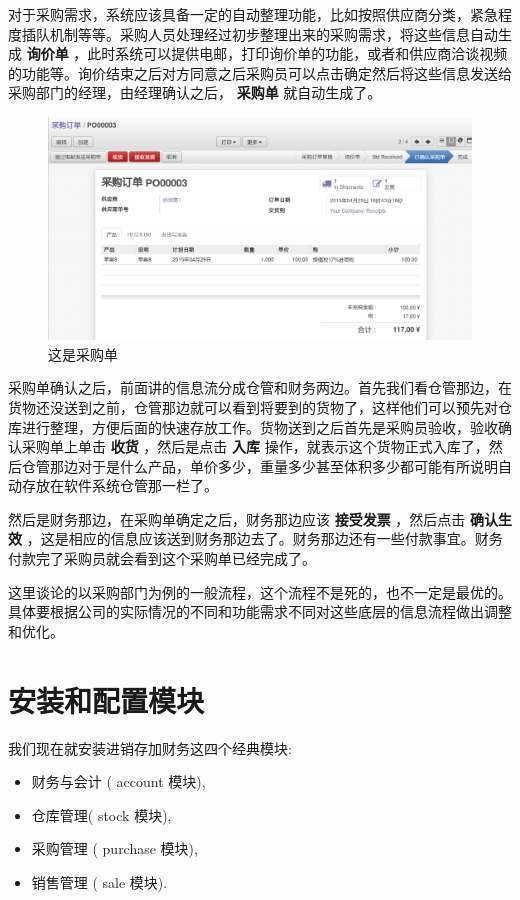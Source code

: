 \documentclass[11pt,a4paper]{sphinxmanual}
\begin{document}
对于采购需求，系统应该具备一定的自动整理功能，比如按照供应商分类，紧急程度插队机制等等。采购人员处理经过初步整理出来的采购需求，将这些信息自动生成 \textbf{询价单} ，此时系统可以提供电邮，打印询价单的功能，或者和供应商洽谈视频的功能等。询价结束之后对方同意之后采购员可以点击确定然后将这些信息发送给采购部门的经理，由经理确认之后， \textbf{采购单} 就自动生成了。

\begin{figure}[H]
\centering
\includegraphics[keepaspectratio,max width=0.95\linewidth]{images/采购单.png}
\caption{这是采购单}
\end{figure}

采购单确认之后，前面讲的信息流分成仓管和财务两边。首先我们看仓管那边，在货物还没送到之前，仓管那边就可以看到将要到的货物了，这样他们可以预先对仓库进行整理，方便后面的快速存放工作。货物送到之后首先是采购员验收，验收确认采购单上单击 \textbf{收货} ，然后是点击 \textbf{入库} 操作，就表示这个货物正式入库了，然后仓管那边对于是什么产品，单价多少，重量多少甚至体积多少都可能有所说明自动存放在软件系统仓管那一栏了。

然后是财务那边，在采购单确定之后，财务那边应该 \textbf{接受发票} ，然后点击 \textbf{确认生效} ，这是相应的信息应该送到财务那边去了。财务那边还有一些付款事宜。财务付款完了采购员就会看到这个采购单已经完成了。

这里谈论的以采购部门为例的一般流程，这个流程不是死的，也不一定是最优的。具体要根据公司的实际情况的不同和功能需求不同对这些底层的信息流程做出调整和优化。


\section{安装和配置模块}
\label{sec-4-10}
我们现在就安装进销存加财务这四个经典模块:
\begin{itemize}
\item 财务与会计 ( account 模块),
\item 仓库管理( stock 模块),
\item 采购管理 ( purchase 模块),
\item 销售管理 ( sale 模块).
\end{itemize}
\end{document}
